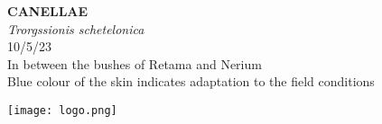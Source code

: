 \documentclass[
  landscape]{article}
\begin{document}
\begin{mdframed}[linecolor=mycolortext, linewidth=2pt, backgroundcolor=mycolor]

  \bigskip
  \begin{flushright}
  \begin{minipage}[t][-50ex][t]{16em}  
  \end{minipage}
  \end{flushright}
  \bigskip
  \begin{adjustwidth}{1cm}{1cm}
  {\fontsize{50pt}{0pt}\selectfont\bf\textcolor{mycolortext}{ CANELLAE }} \\
  \linebreak
  \linebreak
  {\fontsize{40pt}{100pt}\selectfont\textcolor{mycolortext}{\emph{ Trorgssionis schetelonica }}} \\
  \vfill
  {\fontsize{30pt}{100pt}\selectfont\textcolor{mycolortext}{ 10/5/23 }} \\
  \vfill
  {\fontsize{30pt}{100pt}\selectfont\textcolor{mycolortext}{ In between the bushes of Retama and Nerium }} \\
  \vfill
  {\fontsize{30pt}{50pt}\selectfont\textcolor{mycolortext}{ Blue colour of the skin indicates adaptation to the field conditions }} \\
  \end{adjustwidth}
  \begin{center}
  \texttt{[image: logo.png]}
  \end{center}
  \end{mdframed}
  \pagebreak

\end{document}
